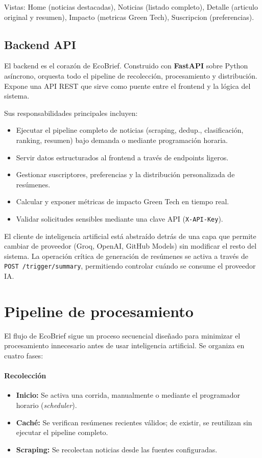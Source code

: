 \documentclass[12pt,oneside]{report}
\begin{document}
Vistas: Home (noticias destacadas), Noticias (listado completo), Detalle (articulo original y resumen), Impacto (metricas Green Tech), Suscripcion (preferencias).

\subsection{Backend API}

El backend es el coraz\'on de EcoBrief. Construido con \textbf{FastAPI} sobre Python as\'incrono, orquesta todo el pipeline de recolecci\'on, procesamiento y distribuci\'on. Expone una API REST que sirve como puente entre el frontend y la l\'ogica del sistema.

Sus responsabilidades principales incluyen:

\begin{itemize}[nosep]
    \item Ejecutar el pipeline completo de noticias (scraping, dedup., clasificaci\'on, ranking, resumen) bajo demanda o mediante programaci\'on horaria.
    \item Servir datos estructurados al frontend a trav\'es de endpoints ligeros.
    \item Gestionar suscriptores, preferencias y la distribuci\'on personalizada de res\'umenes.
    \item Calcular y exponer m\'etricas de impacto Green Tech en tiempo real.
    \item Validar solicitudes sensibles mediante una clave API (\texttt{X-API-Key}).
\end{itemize}

El cliente de inteligencia artificial est\'a abstra\'ido detr\'as de una capa que permite cambiar de proveedor (Groq, OpenAI, GitHub Models) sin modificar el resto del sistema. La operaci\'on cr\'itica de generaci\'on de res\'umenes se activa a trav\'es de \texttt{POST /trigger/summary}, permitiendo controlar cu\'ando se consume el proveedor IA.

\section{Pipeline de procesamiento}

El flujo de EcoBrief sigue un proceso secuencial dise\~nado para minimizar el procesamiento innecesario antes de usar inteligencia artificial. Se organiza en cuatro fases:

\paragraph{Recolecci\'on}
\begin{itemize}[nosep]
    \item \textbf{Inicio:} Se activa una corrida, manualmente o mediante el programador horario (\textit{scheduler}).
    \item \textbf{Cach\'e:} Se verifican res\'umenes recientes v\'alidos; de existir, se reutilizan sin ejecutar el pipeline completo.
    \item \textbf{Scraping:} Se recolectan noticias desde las fuentes configuradas.
\end{itemize}
\end{document}
